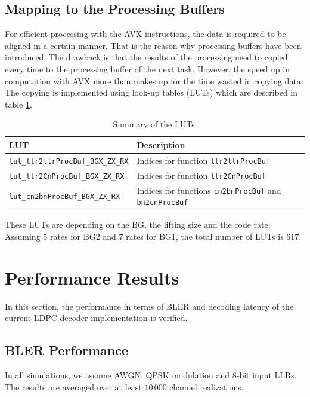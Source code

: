 \documentclass{article}
\begin{document}
\subsection{Mapping to the Processing Buffers}
\label{sec:mapp-cn-proc}

For efficient processing with the AVX instructions, the data is required to be aligned in a certain manner. That is the reason why processing buffers have been introduced. The drawback is that the results of the processing need to copied every time to the processing buffer of the next task. However, the speed up in computation with AVX more than makes up for the time wasted in copying data. The copying is implemented using look-up tables (LUTs) which are described in table \ref{tab:sum_lut}.

\begin{table}[ht]
  \centering
  \begin{tabular}{ll}
    \toprule
    \textbf{LUT} & \textbf{Description} \\
    \midrule
    \texttt{lut\_llr2llrProcBuf\_BGX\_ZX\_RX} & Indices for function \texttt{llr2llrProcBuf} \\
    \texttt{lut\_llr2CnProcBuf\_BGX\_ZX\_RX}  & Indices for function \texttt{llr2CnProcBuf} \\
    \texttt{lut\_cn2bnProcBuf\_BGX\_ZX\_RX}   & Indices for functions \texttt{cn2bnProcBuf} and \texttt{bn2cnProcBuf} \\
    \bottomrule
  \end{tabular}
  \caption{Summary of the LUTs.}
  \label{tab:sum_lut}
\end{table}

These LUTs are depending on the BG, the lifting size and the code rate. Assuming 5 rates for BG2 and 7 rates for BG1, the total number of LUTs is 617.

\newpage
\section{Performance Results}
\label{sec:performance-results}

In this section, the performance in terms of BLER and decoding latency of the current LDPC decoder implementation is verified.

\subsection{BLER Performance}
\label{sec:bler-performance}

In all simulations, we assume AWGN, QPSK modulation and 8-bit input LLRs. The results are averaged over at least $10\,000$ channel realizations.
\end{document}
